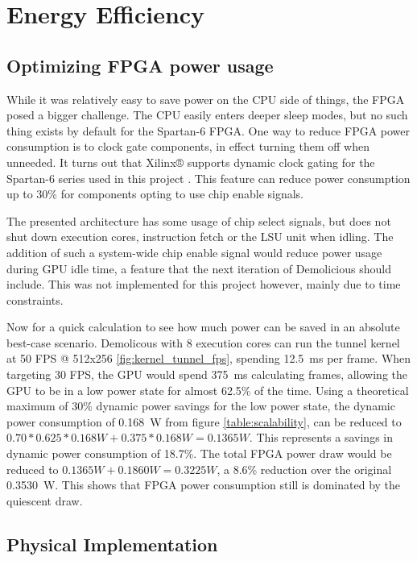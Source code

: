 \documentclass[../main/report.tex]{subfiles}
\begin{document}
\section{Energy Efficiency}

\subsection{Optimizing FPGA power usage}

While it was relatively easy to save power on the CPU side of things, the FPGA posed a bigger challenge.
The CPU easily enters deeper sleep modes, but no such thing exists by default for the Spartan-6 FPGA.
One way to reduce FPGA power consumption is to clock gate components, in effect turning them off when unneeded.
It turns out that Xilinx® supports dynamic clock gating for the Spartan-6 series used in this project \cite{xilinx-clock-gating}.
This feature can reduce power consumption up to 30\% for components opting to use chip enable signals.

The presented architecture has some usage of chip select signals, but does not shut down execution cores, instruction fetch or the LSU unit when idling.
The addition of such a system-wide chip enable signal would reduce power usage during GPU idle time, a feature that the next iteration of Demolicious should include.
This was not implemented for this project however, mainly due to time constraints.

Now for a quick calculation to see how much power can be saved in an absolute best-case scenario.
Demolicous with 8 execution cores can run the tunnel kernel at 50 FPS @ 512x256 \ref{fig:kernel_tunnel_fps}, spending \SI{12.5}{ms} per frame.
When targeting 30 FPS, the GPU would spend \SI{375}{ms} calculating frames, allowing the GPU to be in a low power state for almost 62.5\% of the time.
Using a theoretical maximum of 30\% dynamic power savings for the low power state, the dynamic power consumption of \SI{0.168}{W} from figure \ref{table:scalability}, can be reduced to $ 0.70 * 0.625 * 0.168 W + 0.375 * 0.168 W = 0.1365 W$.
This represents a savings in dynamic power consumption of 18.7\%.
The total FPGA power draw would be reduced to $ 0.1365 W + 0.1860 W = 0.3225 W$, a 8.6\% reduction over the original \SI{0.3530}{W}.
This shows that FPGA power consumption still is dominated by the quiescent draw.

\subsection{Physical Implementation}
\end{document}
